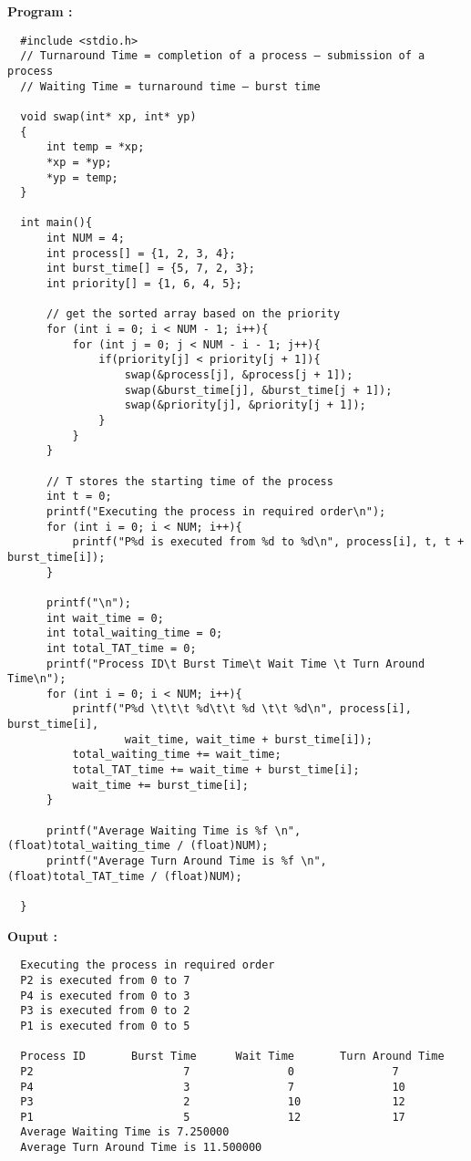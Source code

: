 \documentclass[journal,onecolumn]{IEEEtran}
\begin{document}
\textbf{Program : }
\begin{verbatim}
  #include <stdio.h>
  // Turnaround Time = completion of a process – submission of a process
  // Waiting Time = turnaround time – burst time
  
  void swap(int* xp, int* yp)
  {
      int temp = *xp;
      *xp = *yp;
      *yp = temp;
  }
  
  int main(){
      int NUM = 4;
      int process[] = {1, 2, 3, 4};
      int burst_time[] = {5, 7, 2, 3};
      int priority[] = {1, 6, 4, 5};
  
      // get the sorted array based on the priority
      for (int i = 0; i < NUM - 1; i++){
          for (int j = 0; j < NUM - i - 1; j++){
              if(priority[j] < priority[j + 1]){
                  swap(&process[j], &process[j + 1]);
                  swap(&burst_time[j], &burst_time[j + 1]);
                  swap(&priority[j], &priority[j + 1]);
              }
          }
      }
  
      // T stores the starting time of the process
      int t = 0;
      printf("Executing the process in required order\n");
      for (int i = 0; i < NUM; i++){
          printf("P%d is executed from %d to %d\n", process[i], t, t + burst_time[i]);
      }
  
      printf("\n");
      int wait_time = 0;
      int total_waiting_time = 0;
      int total_TAT_time = 0;
      printf("Process ID\t Burst Time\t Wait Time \t Turn Around Time\n");
      for (int i = 0; i < NUM; i++){
          printf("P%d \t\t\t %d\t\t %d \t\t %d\n", process[i], burst_time[i], 
                  wait_time, wait_time + burst_time[i]);
          total_waiting_time += wait_time;
          total_TAT_time += wait_time + burst_time[i];
          wait_time += burst_time[i];
      }
  
      printf("Average Waiting Time is %f \n", (float)total_waiting_time / (float)NUM);
      printf("Average Turn Around Time is %f \n", (float)total_TAT_time / (float)NUM);
  
  }
\end{verbatim}


\textbf{Ouput :}
\begin{verbatim}
  Executing the process in required order
  P2 is executed from 0 to 7
  P4 is executed from 0 to 3
  P3 is executed from 0 to 2
  P1 is executed from 0 to 5
  
  Process ID       Burst Time      Wait Time       Turn Around Time
  P2                       7               0               7
  P4                       3               7               10
  P3                       2               10              12
  P1                       5               12              17
  Average Waiting Time is 7.250000 
  Average Turn Around Time is 11.500000 
\end{verbatim}
\end{document}
